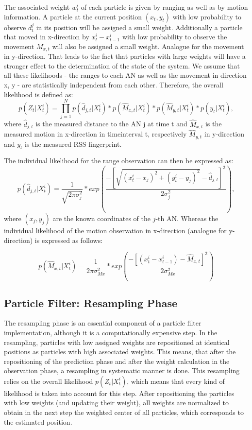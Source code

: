 The associated weight $w^{i}_{t}$ of each particle is given by ranging as well as by motion information. A particle at the current position $(x_{t},y_{t})$ with low probability to observe $d_{t}^{j}$ in its position will be assigned a small weight. Additionally a particle that moved in x-direction by $x_{t}^{i}-x_{t-1}^{i}$ with low probability to observe the movement $M_{x,t}$ will also be assigned a small weight. Analogue for the movement in y-direction.
That leads to the fact that particles with large weights will have a stronger effect to the determination of the state of the system.
We assume that all these likelihoods - the ranges to each AN as well as the movement in direction x, y - are statistically independent from each other. Therefore, the overall likelihood is defined as:
\begin{equation}
p(Z_{t} | X^{i}_{t}) = \prod_{j=1}^{N} p(\hat{d}_{j,t}|X_{t}^{i}) * p(\hat{M}_{x,t} | X^{i}_{t}) * p(\hat{M}_{y,t} | X^{i}_{t}) * p(y_t | X^{i}_{t}),
\label{eqn:probability_overall}
\end{equation}
where $\hat{d}_{j,t}$ is the measured distance to the AN j at time t and $\hat{M}_{x,t}$ is the measured motion in x-direction in timeinterval t, respectively $\hat{M}_{y,t}$ in y-direction and $y_t$ is the measured RSS fingerprint.

The individual likelihood for the range observation can then be expressed as:
\begin{equation}
p(\hat{d}_{j,t} | X^{i}_{t}) = \frac{1}{\sqrt{2\pi \sigma_{j}^{2}}} * exp(\frac{-[\sqrt{(x^{i}_{t}-x_{j})^{2}+(y^{i}_{t}-y_{j})^{2}} - \hat{d}_{j,t}]^{2}}{2\sigma_{j}^{2}}),
\label{eqn:probability_individual_distance}
\end{equation}
where $(x_{j},y_{j})$ are the known coordinates of the $j$-th AN.
Whereas the individual likelihood of the motion observation in x-direction (analogue for y-direction) is expressed as follows:

\begin{equation}
p(\hat{M}_{x,t} | X^{i}_{t}) = \frac{1}{2\pi \sigma_{Mx}^{2}} * exp(\frac{-[(x^{i}_{t}-x^{i}_{t-1}) - \hat{M}_{x,t}]^{2}}{2\sigma_{Mx}^{2}})
\label{eqn:probability_individual_movement}
\end{equation}

\subsection{Particle Filter: Resampling Phase}
The resampling phase is an essential component of a particle filter implementation, although it is a computationally expensive step. In the resampling, particles with low assigned weights are repositioned at identical positions as particles with high associated weights. This means, that after the repositioning of the prediction phase and after the weight calculation in the observation phase, a resampling in systematic manner is done. This resampling relies on the overall likelihood $p(Z_{t} | X^{i}_{t})$, which means that every kind of likelihood is taken into account for this step. After repositioning the particles with low weights (and updating their weight), all weights are normalized to obtain in the next step the weighted center of all particles, which corresponds to the estimated position. 

